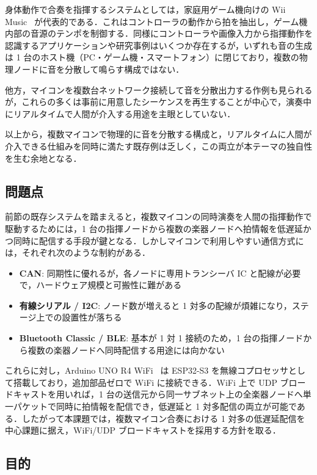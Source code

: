 身体動作で合奏を指揮するシステムとしては，家庭用ゲーム機向けの Wii Music~\cite{nintendo_wiimusic} が代表的である．これはコントローラの動作から拍を抽出し，ゲーム機内部の音源のテンポを制御する．同様にコントローラや画像入力から指揮動作を認識するアプリケーションや研究事例はいくつか存在するが，いずれも音の生成は 1 台のホスト機（PC・ゲーム機・スマートフォン）に閉じており，複数の物理ノードに音を分散して鳴らす構成ではない．

他方，マイコンを複数台ネットワーク接続して音を分散出力する作例も見られるが，これらの多くは事前に用意したシーケンスを再生することが中心で，演奏中にリアルタイムで人間が介入する用途を主眼としていない．

以上から，複数マイコンで物理的に音を分散する構成と，リアルタイムに人間が介入できる仕組みを同時に満たす既存例は乏しく，この両立が本テーマの独自性を生む余地となる．

\subsection{問題点}
\label{subsec:problems}

前節の既存システムを踏まえると，複数マイコンの同時演奏を人間の指揮動作で駆動するためには，1 台の指揮ノードから複数の楽器ノードへ拍情報を低遅延かつ同時に配信する手段が鍵となる．しかしマイコンで利用しやすい通信方式には，それぞれ次のような制約がある．

\begin{itemize}
  \item \textbf{CAN}: 同期性に優れるが，各ノードに専用トランシーバ IC と配線が必要で，ハードウェア規模と可搬性に難がある
  \item \textbf{有線シリアル / I2C}: ノード数が増えると 1 対多の配線が煩雑になり，ステージ上での設置性が落ちる
  \item \textbf{Bluetooth Classic / BLE}: 基本が 1 対 1 接続のため，1 台の指揮ノードから複数の楽器ノードへ同時配信する用途には向かない
\end{itemize}

これらに対し，Arduino UNO R4 WiFi~\cite{arduino_uno_r4} は ESP32-S3 を無線コプロセッサとして搭載しており，追加部品ゼロで WiFi に接続できる．WiFi 上で UDP ブロードキャストを用いれば，1 台の送信元から同一サブネット上の全楽器ノードへ単一パケットで同時に拍情報を配信でき，低遅延と 1 対多配信の両立が可能である．したがって本課題では，複数マイコン合奏における 1 対多の低遅延配信を中心課題に据え，WiFi/UDP ブロードキャストを採用する方針を取る．

\subsection{目的}
\label{subsec:purpose}

